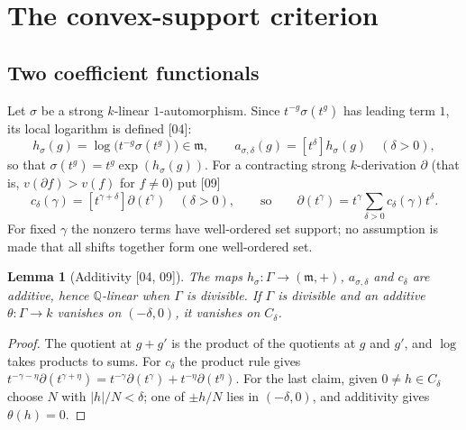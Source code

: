 \documentclass[11pt,oneside]{article}
\numberwithin{equation}{section}
\newtheorem{lemma}[lemma]{Lemma}
\theoremstyle{definition}
\theoremstyle{remark}
\newcommand{\Q}{\mathbb Q}
\newcommand{\mm}{\mathfrak m}
\newcommand{\coef}[2]{[t^{#1}]#2}
\newcommand{\src}[1]{\textup{\textsf{\small[#1]}}}
\begin{document}
\section{The convex-support criterion}\label{opa:sec:criterion}

\subsection{Two coefficient functionals}

Let $\sigma$ be a strong $k$-linear $1$-automorphism. Since $t^{-g}\sigma(t^g)$
has leading term $1$, its local logarithm is defined \src{04}:
\begin{equation}\label{opa:eq:logchar}
 h_\sigma(g)=\log\bigl(t^{-g}\sigma(t^g)\bigr)\in\mm,\qquad
 a_{\sigma,\delta}(g)=\coef\delta{h_\sigma(g)}\quad(\delta>0),
\end{equation}
so that $\sigma(t^g)=t^g\exp(h_\sigma(g))$. For a contracting strong
$k$-derivation $\partial$ (that is, $v(\partial f)>v(f)$ for $f\ne0$) put
\src{09}
\begin{equation}\label{opa:eq:opcoef}
 c_\delta(\gamma)=\coef{\gamma+\delta}{\partial(t^\gamma)}\quad(\delta>0),
 \qquad\text{so}\qquad
 \partial(t^\gamma)=t^\gamma\sum_{\delta>0}c_\delta(\gamma)t^\delta .
\end{equation}
For fixed $\gamma$ the nonzero terms have well-ordered set support; no
assumption is made that all shifts together form one well-ordered set.

\begin{lemma}[Additivity \src{04, 09}]\label{opa:lem:additive}
The maps $h_\sigma:\Gamma\to(\mm,+)$, $a_{\sigma,\delta}$ and $c_\delta$ are
additive, hence $\Q$-linear when $\Gamma$ is divisible. If $\Gamma$ is divisible
and an additive $\theta:\Gamma\to k$ vanishes on $(-\delta,0)$, it vanishes on
$C_\delta$.
\end{lemma}
\begin{proof}
The quotient at $g+g'$ is the product of the quotients at $g$ and $g'$, and
$\log$ takes products to sums. For $c_\delta$ the product rule gives
$t^{-\gamma-\eta}\partial(t^{\gamma+\eta})=t^{-\gamma}\partial(t^\gamma)
+t^{-\eta}\partial(t^\eta)$. For the last claim, given $0\ne h\in C_\delta$
choose $N$ with $|h|/N<\delta$; one of $\pm h/N$ lies in $(-\delta,0)$, and
additivity gives $\theta(h)=0$.
\end{proof}
\end{document}
